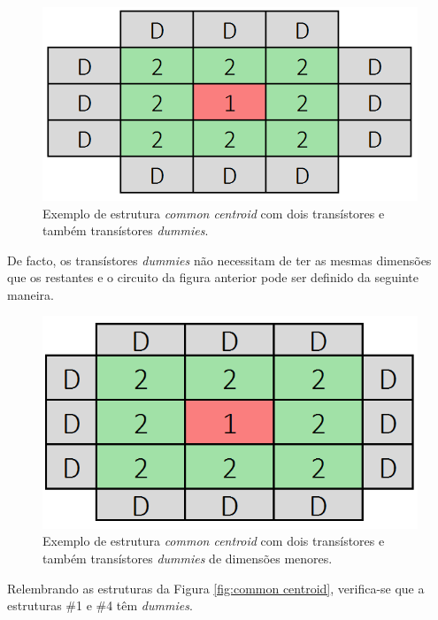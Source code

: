\documentclass[11pt]{article}
\numberwithin{equation}{section}
\begin{document}
\begin{figure}[H]
	\centering
	\includegraphics[keepaspectratio=true, scale=0.35]{teoricas/dummy2}
	\vspace{-0.5em}
	\caption{Exemplo de estrutura \textit{common centroid} com dois transístores e também transístores \textit{dummies}.}
	\vspace{-0.8em}
\end{figure}

De facto, os transístores \textit{dummies} não necessitam de ter as mesmas dimensões que os restantes e o circuito da figura anterior pode ser definido da seguinte maneira.

\begin{figure}[H]
	\centering
	\includegraphics[keepaspectratio=true, scale=0.35]{teoricas/dummy3}
	\vspace{-0.5em}
	\caption{Exemplo de estrutura \textit{common centroid} com dois transístores e também transístores \textit{dummies} de dimensões menores.}
	\vspace{-0.8em}
\end{figure}

Relembrando as estruturas da Figura \ref{fig:common centroid}, verifica-se que a estruturas \#1 e \#4 têm \textit{dummies}.
\end{document}
